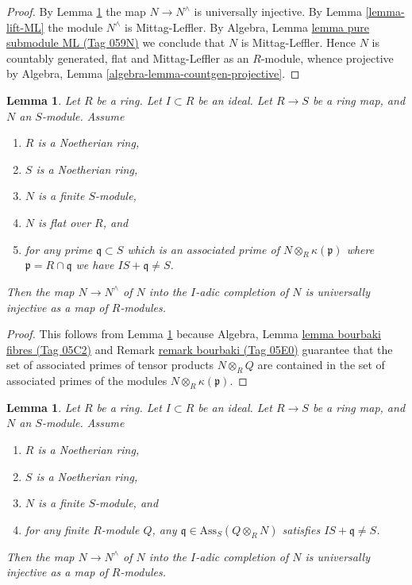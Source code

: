 \documentclass{amsart}
\theoremstyle{plain}
\newtheorem{lemma}[subsection]{Lemma}
\theoremstyle{definition}
\theoremstyle{remark}
\numberwithin{equation}{subsection}
\begin{document}
\begin{proof}
By
Lemma \ref{lemma-universally-injective-to-completion-flat}
the map $N \to N^\wedge$ is universally injective.
By
Lemma \ref{lemma-lift-ML}
the module $N^\wedge$ is Mittag-Leffler.
By
Algebra, Lemma \href{https://stacks.math.columbia.edu/tag/059N}{lemma pure submodule ML (Tag 059N)}
we conclude that $N$ is Mittag-Leffler.
Hence $N$ is countably generated, flat and Mittag-Leffler as an $R$-module,
whence projective by
Algebra, Lemma \ref{algebra-lemma-countgen-projective}.
\end{proof}


\begin{lemma}
\label{lemma-universally-injective-to-completion-flat}
Let $R$ be a ring.
Let $I \subset R$ be an ideal.
Let $R \to S$ be a ring map, and $N$ an $S$-module.
Assume
\begin{enumerate}
\item $R$ is a Noetherian ring,
\item $S$ is a Noetherian ring,
\item $N$ is a finite $S$-module,
\item $N$ is flat over $R$, and
\item for any prime $\mathfrak q \subset S$ which is an associated prime of
$N \otimes_R \kappa(\mathfrak p)$ where $\mathfrak p = R \cap \mathfrak q$
we have $IS + \mathfrak q \not = S$.
\end{enumerate}
Then the map $N \to N^\wedge$ of $N$ into the $I$-adic completion of $N$
is universally injective as a map of $R$-modules.
\end{lemma}

\begin{proof}
This follows from
Lemma \ref{lemma-universally-injective-to-completion}
because
Algebra, Lemma
\href{https://stacks.math.columbia.edu/tag/05C2}{lemma bourbaki fibres (Tag 05C2)} and
Remark \href{https://stacks.math.columbia.edu/tag/05E0}{remark bourbaki (Tag 05E0)}
guarantee that the set of associated primes of tensor products
$N \otimes_R Q$ are contained in the set of associated primes of
the modules $N \otimes_R \kappa(\mathfrak p)$.
\end{proof}


\begin{lemma}
\label{lemma-universally-injective-to-completion}
Let $R$ be a ring.
Let $I \subset R$ be an ideal.
Let $R \to S$ be a ring map, and $N$ an $S$-module.
Assume
\begin{enumerate}
\item $R$ is a Noetherian ring,
\item $S$ is a Noetherian ring,
\item $N$ is a finite $S$-module, and
\item for any finite $R$-module $Q$, any
$\mathfrak q \in \text{Ass}_S(Q \otimes_R N)$
satisfies $IS + \mathfrak q \not = S$.
\end{enumerate}
Then the map $N \to N^\wedge$ of $N$ into the $I$-adic completion of $N$
is universally injective as a map of $R$-modules.
\end{lemma}
\end{document}
